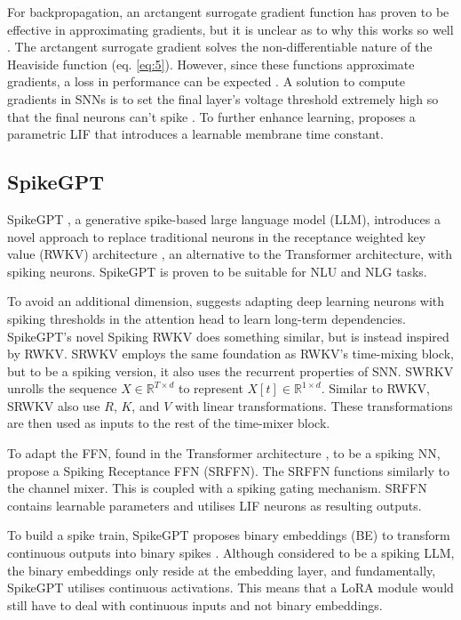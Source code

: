 \documentclass{article} %
\begin{document}
For backpropagation, an arctangent surrogate gradient function has proven to be effective in approximating gradients, but it is unclear as to why this works so well \citep{eshraghian_training_2023-1}. The arctangent surrogate gradient solves the non-differentiable nature of the Heaviside function (eq. \ref{eq:5}). However, since these functions approximate gradients, a loss in performance can be expected \citep{pfeiffer_deep_2018}. A solution to compute gradients in SNNs is to set the final layer's voltage threshold extremely high so that the final neurons can't spike \citep{lee_enabling_2020-1}. To further enhance learning, \citet{fang_incorporating_2021} proposes a parametric LIF that introduces a learnable membrane time constant.

\subsection{SpikeGPT}
SpikeGPT \citep{zhu_spikegpt_2024-1}, a generative spike-based large language model (LLM), introduces a novel approach to replace traditional neurons in the receptance weighted key value (RWKV) architecture \citep{peng_rwkv_2023}, an alternative to the Transformer architecture, with spiking neurons. SpikeGPT is proven to be suitable for NLU and NLG tasks.

\label{srwkv} 
To avoid an additional dimension, \citet{eshraghian_training_2023-1} suggests adapting deep learning neurons with spiking thresholds in the attention head to learn long-term dependencies. SpikeGPT's novel Spiking RWKV \citep{zhu_spikegpt_2024-1} does something similar, but is instead inspired by RWKV. SRWKV employs the same foundation as RWKV's time-mixing block, but to be a spiking version, it also uses the recurrent properties of SNN. SWRKV unrolls the sequence \(X \in \mathbb{R}^{T \times d}\) to represent \(X[t] \in \mathbb{R}^{1 \times d}\). Similar to RWKV, SRWKV also use \(R\), \(K\), and \(V\) with linear transformations. These transformations are then used as inputs to the rest of the time-mixer block.

To adapt the FFN, found in the Transformer architecture \citep{vaswani_attention_2017}, to be a spiking NN, \citet{zhu_spikegpt_2024-1} propose a Spiking Receptance FFN (SRFFN). The SRFFN functions similarly to the channel mixer. This is coupled with a spiking gating mechanism. SRFFN contains learnable parameters and utilises LIF neurons as resulting outputs.

To build a spike train, SpikeGPT proposes binary embeddings (BE) to transform continuous outputs into binary spikes \citep{zhu_spikegpt_2024-1}. Although considered to be a spiking LLM, the binary embeddings only reside at the embedding layer, and fundamentally, SpikeGPT utilises continuous activations. This means that a LoRA module would still have to deal with continuous inputs and not binary embeddings.
\end{document}
